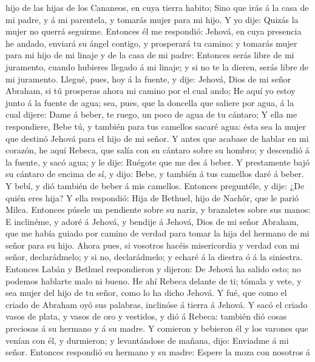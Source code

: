 hijo de las hijas de los Cananeos, en cuya tierra habito; 
Sino que irás á la casa de mi padre, y á mi parentela, y tomarás mujer
para mi hijo.  Y yo dije: Quizás la mujer no querrá
seguirme.  Entonces él me respondió: Jehová, en cuya
presencia he andado, enviará su ángel contigo, y prosperará tu camino; y
tomarás mujer para mi hijo de mi linaje y de la casa de mi padre:
 Entonces serás libre de mi juramento, cuando hubieres
llegado á mi linaje; y si no te la dieren, serás libre de mi juramento.
 Llegué, pues, hoy á la fuente, y dije: Jehová, Dios de mi
señor Abraham, si tú prosperas ahora mi camino por el cual ando;
 He aquí yo estoy junto á la fuente de agua; sea, pues, que
la doncella que saliere por agua, á la cual dijere: Dame á beber, te
ruego, un poco de agua de tu cántaro;  Y ella me
respondiere, Bebe tú, y también para tus camellos sacaré agua: ésta sea
la mujer que destinó Jehová para el hijo de mi señor.  Y
antes que acabase de hablar en mi corazón, he aquí Rebeca, que salía con
su cántaro sobre su hombro; y descendió á la fuente, y sacó agua; y le
dije: Ruégote que me des á beber.  Y prestamente bajó su
cántaro de encima de sí, y dijo: Bebe, y también á tus camellos daré á
beber. Y bebí, y dió también de beber á mis camellos. 
Entonces preguntéle, y dije: ¿De quién eres hija? Y ella respondió: Hija
de Bethuel, hijo de Nachôr, que le parió Milca. Entonces púsele un
pendiente sobre su nariz, y brazaletes sobre sus manos:  E
inclinéme, y adoré á Jehová, y bendije á Jehová, Dios de mi señor
Abraham, que me había guiado por camino de verdad para tomar la hija del
hermano de mi señor para su hijo.  Ahora pues, si vosotros
hacéis misericordia y verdad con mi señor, declarádmelo; y si no,
declarádmelo; y echaré á la diestra ó á la siniestra. 
Entonces Labán y Bethuel respondieron y dijeron: De Jehová ha salido
esto; no podemos hablarte malo ni bueno.  He ahí Rebeca
delante de ti; tómala y vete, y sea mujer del hijo de tu señor, como lo
ha dicho Jehová.  Y fué, que como el criado de Abraham oyó
sus palabras, inclinóse á tierra á Jehová.  Y sacó el
criado vasos de plata, y vasos de oro y vestidos, y dió á Rebeca:
también dió cosas preciosas á su hermano y á su madre.  Y
comieron y bebieron él y los varones que venían con él, y durmieron; y
levantándose de mañana, dijo: Enviadme á mi señor. 
Entonces respondió su hermano y su madre: Espere la moza con nosotros á

